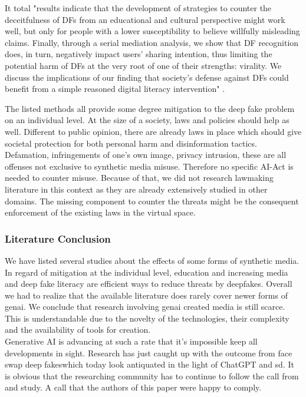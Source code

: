 \documentclass[
  a4paper,  %
  twoside,  %
  bibliography=totoc,
  headsepline,
  cleardoublepage=empty,
  parskip=half,
  draft=false
]{scrbook}
\begin{document}
It total "results indicate that the development of strategies to counter the deceitfulness of DFs from an educational and cultural perspective might work well, but only for people with a lower susceptibility to believe willfully misleading claims. Finally, through a serial mediation analysis, we show that DF recognition does, in turn, negatively impact users' sharing intention, thus limiting the potential harm of DFs at the very root of one of their strengths: virality. We discuss the implications of our finding that society's defense against DFs could benefit from a simple reasoned digital literacy intervention" \cite{iacobucciDeepfakesUnmaskedEffects2021}.

The listed methods all provide some degree mitigation to the deep fake problem on an individual level. At the size of a society, laws and policies should help as well. Different to public opinion, there are already laws in place which should give societal protection for both personal harm and disinformation tactics. Defamation, infringements of one's own image, privacy intrusion, these are all offenses not exclusive to synthetic media misuse. Therefore no specific AI-Act is needed to counter misuse. Because of that, we did not research lawmaking literature in this context as they are already extensively studied in other domains. The missing component to counter the threats might be the consequent enforcement of the existing laws in the virtual space. 

\subsubsection*{Literature Conclusion}
We have listed several studies about the effects of some forms of synthetic media. In regard of mitigation at the individual level, education and increasing media and deep fake literacy are efficient ways to reduce threats by deepfakes. Overall we had to realize that the available literature does rarely cover newer forms of \gls{genai}.
We conclude that research involving \gls{genai} created media is still scarce. This is understandable due to the novelty of the technologies, their complexity and the availability of tools for creation. \\
Generative AI is advancing at such a rate that it's impossible keep all developments in sight. Research has just caught up with the outcome from face swap deep fakeswhich today look antiquated in the light of ChatGPT and \gls{sd}. 
It is obvious that the researching community has to continue to follow the call from \citet{hancockSocialImpactDeepfakes2021} and study. A call that the authors of this paper were happy to comply.
\end{document}
